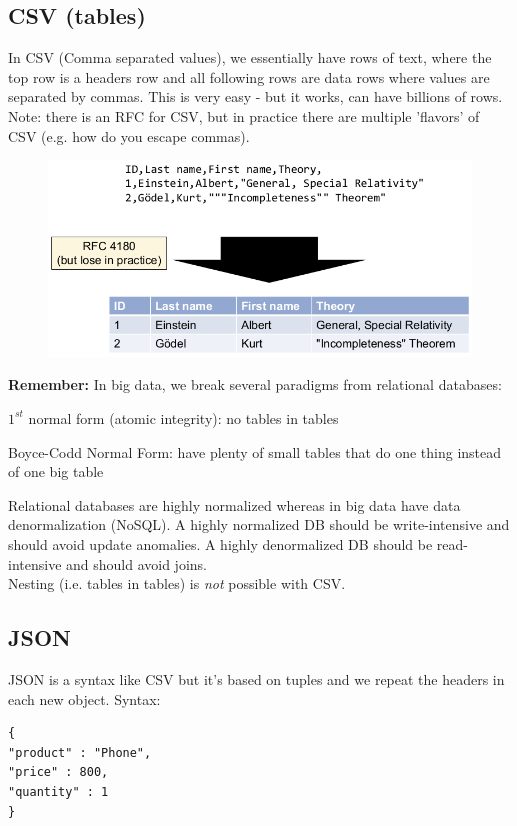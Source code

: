 \documentclass[11pt,oneside,a4paper]{article}
\begin{document}
\subsection{CSV (tables)}

In CSV (Comma separated values), we essentially have rows of text, where the top row is a headers row and all following rows are data rows where values are separated by commas. This is very easy - but it works, can have billions of rows. Note: there is an RFC for CSV, but in practice there are multiple 'flavors' of CSV (e.g. how do you escape commas).

\begin{figure}[hb!]
	\centering
	\includegraphics[width=0.4\linewidth]{figures/csv}
	\label{fig:csv}
\end{figure}

\textbf{Remember:} In big data, we break several paradigms from relational databases:

\begin{compactitem}
	\item $1^{st}$ normal form (atomic integrity): no tables in tables
	\item Boyce-Codd Normal Form: have plenty of small tables that do one thing instead of one big table
\end{compactitem}

Relational databases are highly normalized whereas in big data have data denormalization (NoSQL). A highly normalized DB should be write-intensive and should avoid update anomalies. A highly denormalized DB should be read-intensive and should avoid joins.\\
Nesting (i.e. tables in tables) is \textit{not} possible with CSV.

\subsection{JSON}

JSON is a syntax like CSV but it's based on tuples and we repeat the headers in each new object. Syntax:

\vspace{-\topsep}
\begin{verbatim}
{
"product" : "Phone",
"price" : 800,
"quantity" : 1
}
\end{verbatim}
\vspace{-\topsep}
\end{document}
